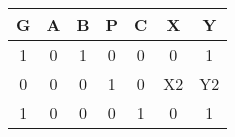 \begin{tabular}{|c| |c| |c| |c| |c| |c| |c|}
\hline
  \textbf {G} & \textbf{A} & \textbf{B} & \textbf{P} & \textbf{C} & \textbf{X} & \textbf{Y} \\
  \hline
   1 & 0 & 1 & 0 & 0 & 0 & 1\\
   \hline
   0 & 0 & 0 & 1 & 0 & X2 & Y2 \\
   \hline
   1 & 0 & 0 & 0 & 1 & 0 & 1 \\
   \hline
   \end{tabular}

